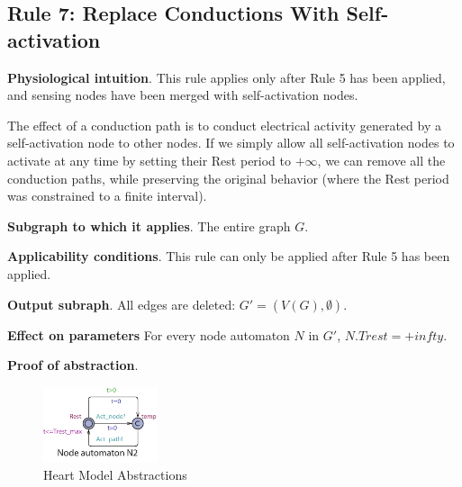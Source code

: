 \subsection{Rule 7: Replace Conductions With Self-activation}
\textbf{Physiological intuition}. 
This rule applies only after Rule 5 has been applied, and sensing nodes have been merged with self-activation nodes.

The effect of a conduction path is to conduct electrical activity generated by a self-activation node to other nodes. 
If we simply allow all self-activation nodes to activate at any time by setting their Rest period to $+\infty$, we can remove all the conduction paths, while preserving the original behavior (where the Rest period was constrained to a finite interval).

\textbf{Subgraph to which it applies}.
The entire graph $G$.

\textbf{Applicability conditions}.
This rule can only be applied after Rule 5 has been applied.

\textbf{Output subraph}.
All edges are deleted: $G' = (V(G), \emptyset)$.

\textbf{Effect on parameters}
For every node automaton $N$ in $G'$, $N.Trest = +infty$.

\textbf{Proof of abstraction}.

\begin{figure}[!h]
	\centering
	\includegraphics[width=0.3\textwidth]{figs/rule6.pdf}
	\caption{\small Heart Model Abstractions}
	\label{fig:rule6}
\end{figure}

